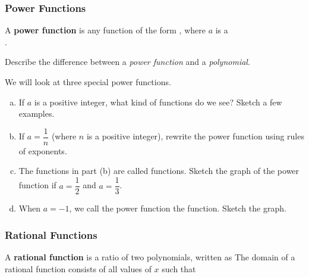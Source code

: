 \documentclass[notes]{subfiles}
\begin{document}
	\subsubsection*{Power Functions}
		\begin{defn}
			A \textbf{power function} is any function of the form , where $a$ is a\\  .
		\end{defn}
		
		\begin{ex}
			Describe the difference between a \emph{power function} and a \emph{polynomial}.
		\end{ex}
			
		\begin{ex}
			We will look at three special power functions.
			\begin{enumerate}[(a)]
				\item If $a$ is a positive integer, what kind of functions do we see?  Sketch a few examples.

				\item If $a = \dfrac{1}{n}$ (where $n$ is a positive integer), rewrite the power function using rules of exponents.  
					\newpage

				\item The functions in part (b) are called  functions.  Sketch the graph of the power function if $a = \dfrac{1}{2}$ and $a = \dfrac{1}{3}$.  
					
					
				\item When $a=-1$, we call the power function the  function.  Sketch the graph.
					
			\end{enumerate}
		\end{ex}
				
	\subsubsection*{Rational Functions}
		\begin{defn}
			A \textbf{rational function} is a ratio of two polynomials, written as
			The domain of a rational function consists of all values of $x$ such that 
		\end{defn}
		
\end{document}
